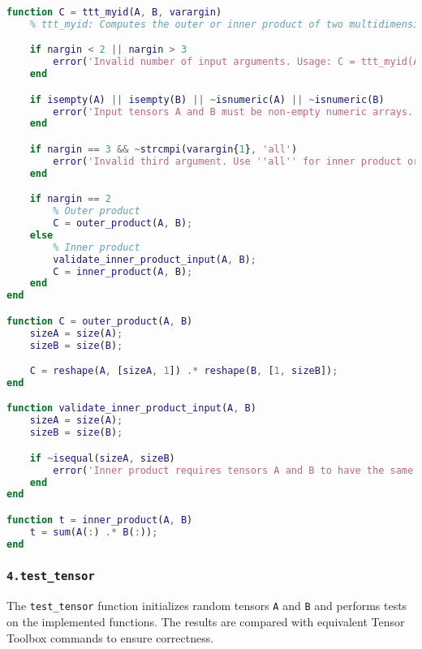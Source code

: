 \begin{center}
    \begin{lstlisting}[language=MATLAB, caption= Inner and Outer Porduct of Tensors]
    function C = ttt_myid(A, B, varargin)
    % ttt_myid: Computes the outer or inner product of two multidimensional arrays A and B.

    if nargin < 2 || nargin > 3
        error('Invalid number of input arguments. Usage: C = ttt_myid(A, B) or t = ttt_myid(A, B, ''all'').');
    end

    if isempty(A) || isempty(B) || ~isnumeric(A) || ~isnumeric(B)
        error('Input tensors A and B must be non-empty numeric arrays.');
    end

    if nargin == 3 && ~strcmpi(varargin{1}, 'all')
        error('Invalid third argument. Use ''all'' for inner product or omit for outer product.');
    end

    if nargin == 2
        % Outer product
        C = outer_product(A, B);
    else
        % Inner product
        validate_inner_product_input(A, B);
        C = inner_product(A, B);
    end
end

function C = outer_product(A, B)
    sizeA = size(A);
    sizeB = size(B);

    C = reshape(A, [sizeA, 1]) .* reshape(B, [1, sizeB]);
end

function validate_inner_product_input(A, B)
    sizeA = size(A);
    sizeB = size(B);

    if ~isequal(sizeA, sizeB)
        error('Inner product requires tensors A and B to have the same dimensions.');
    end
end

function t = inner_product(A, B)
    t = sum(A(:) .* B(:));
end

    \end{lstlisting}
\end{center}

\subsubsection*{\texttt{4.test\_tensor}}

The \texttt{test\_tensor} function initializes random tensors \texttt{A} and \texttt{B} and performs tests on the implemented functions. The results are compared with equivalent Tensor Toolbox commands to ensure correctness.

